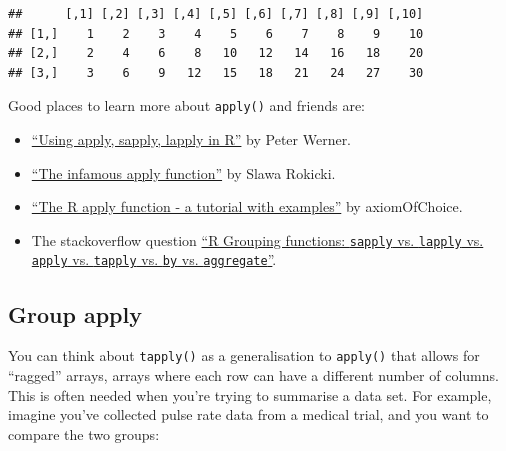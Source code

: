 \begin{verbatim}
##      [,1] [,2] [,3] [,4] [,5] [,6] [,7] [,8] [,9] [,10]
## [1,]    1    2    3    4    5    6    7    8    9    10
## [2,]    2    4    6    8   10   12   14   16   18    20
## [3,]    3    6    9   12   15   18   21   24   27    30
\end{verbatim}

Good places to learn more about \texttt{apply()} and friends are:

\begin{itemize}
\item
  \href{http://petewerner.blogspot.com/2012/12/using-apply-sapply-lapply-in-r.html}{``Using
  apply, sapply, lapply in R''} by Peter Werner.
\item
  \href{http://rforpublichealth.blogspot.no/2012/09/the-infamous-apply-function.html}{``The
  infamous apply function''} by Slawa Rokicki.
\item
  \href{http://forgetfulfunctor.blogspot.com/2011/07/r-apply-function-tutorial-with-examples.html}{``The
  R apply function - a tutorial with examples''} by axiomOfChoice.
\item
  The stackoverflow question
  \href{http://stackoverflow.com/questions/3505701}{``R Grouping
  functions: \texttt{sapply} vs. \texttt{lapply} vs. \texttt{apply} vs.
  \texttt{tapply} vs. \texttt{by} vs. \texttt{aggregate}''}.
\end{itemize}

\hypertarget{group-apply}{%
\subsection{Group apply}\label{group-apply}}

You can think about \texttt{tapply()} as a generalisation to
\texttt{apply()} that allows for ``ragged'' arrays, arrays where each
row can have a different number of columns. This is often needed when
you're trying to summarise a data set. For example, imagine you've
collected pulse rate data from a medical trial, and you want to compare
the two groups: 

\begin{Shaded}
\begin{Highlighting}[]
\StringTok{ }\NormalTok{(}\NormalTok{(}\NormalTok{, }\NormalTok{, } \OperatorTok{/}\StringTok{ }\NormalTok{)) }\OperatorTok{+}\StringTok{ }\NormalTok{(}\NormalTok{(}\NormalTok{, }\NormalTok{), }\NormalTok{(}\NormalTok{, }\NormalTok{))}
\StringTok{ }\NormalTok{(}\NormalTok{(}\NormalTok{, }\NormalTok{), }\NormalTok{(}\NormalTok{, }\NormalTok{))}

\end{Highlighting}
\end{Shaded}

